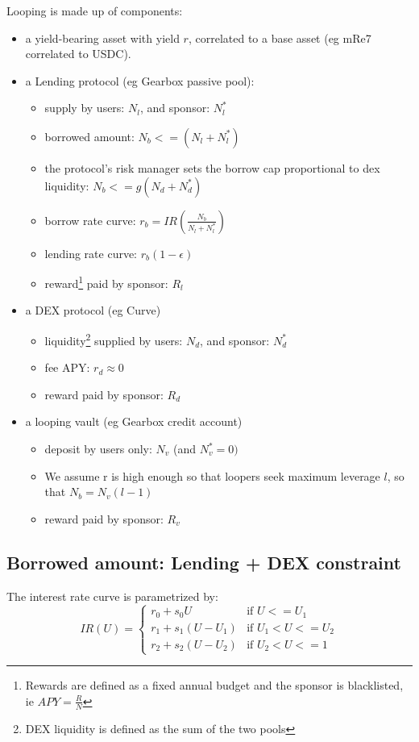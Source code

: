 \documentclass{article}
\begin{document}
Looping is made up of components:
    \begin{itemize}
        \item a yield-bearing asset with yield $r$, correlated to a base asset (eg mRe7 correlated to USDC).
        \item a Lending protocol (eg Gearbox passive pool):
        \begin{itemize}
            \item supply by users: $N_l$, and sponsor: $N_l^*$
            \item borrowed amount: $N_b<=(N_l+N_l^*)$
            \item the protocol's risk manager sets the borrow cap proportional to dex liquidity: $N_b<=g (N_d+N_d^*)$
            \item borrow rate curve: $r_b=IR(\frac{N_b}{N_l+N_l^*})$
            \item lending rate curve: $r_b(1-\epsilon)$
            \item reward\footnote{Rewards are defined as a fixed annual budget and the sponsor is blacklisted, ie $APY = \frac{R}{N}$} paid by sponsor: $R_l$
        \end{itemize}
        \item a DEX protocol (eg Curve)
        \begin{itemize}
            \item liquidity\footnote{DEX liquidity is defined as the sum of the two pools} supplied by users: $N_d$, and sponsor: $N_d^*$ 
            \item fee APY: $r_d\approx 0$
            \item reward paid by sponsor: $R_d$
        \end{itemize}
        \item a looping vault (eg Gearbox credit account)
        \begin{itemize}
            \item deposit by users only: $N_v$ (and $N_v^*=0)$
            \item We assume r is high enough so that loopers seek maximum leverage $l$, so that $N_b=N_v(l-1)$
            \item reward paid by sponsor: $R_v$
        \end{itemize}
    \end{itemize}

    \subsection{Borrowed amount: Lending + DEX constraint}
    The interest rate curve is parametrized by:
    \begin{equation*}
        IR(U) = \begin{cases}
        r_0+s_0 U & \text{if } U<=U_1\\
        r_1+s_1 (U-U_1) & \text{if } U_1<U<=U_2\\
        r_2+s_2 (U-U_2) & \text{if } U_2<U<=1
        \end{cases}
    \end{equation*}
    
\end{document}
